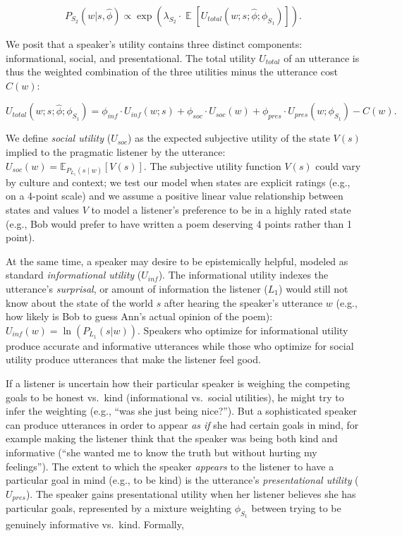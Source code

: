 \documentclass[oneside]{report}
\begin{document}
\[P_{S_2}(w | s, \hat{\phi}) \propto \exp(\lambda_{S_2} \cdot \mathop{\mathbb{E}}[U_{total}(w; s; \hat{\phi}; \phi_{S_1})]).\]

We posit that a speaker's utility contains three distinct components:
informational, social, and presentational. The total utility
\(U_{total}\) of an utterance is thus the weighted combination of the
three utilities minus the utterance cost \(C(w)\):

\[U_{total}(w; s; \hat{\phi}; \phi_{S_1}) = \phi_{inf} \cdot U_{inf}(w; s) + \phi_{soc} \cdot U_{soc}(w) + \phi_{pres} \cdot U_{pres}(w; \phi_{S_1}) - C(w).\]

We define \emph{social utility} (\(U_{soc}\)) as the expected subjective
utility of the state \(V(s)\) implied to the pragmatic listener by the
utterance: \(U_{soc}(w) = \mathbb{E}_{P_{L_1}(s \mid w)}[V(s)]\). The
subjective utility function \(V(s)\) could vary by culture and context;
we test our model when states are explicit ratings (e.g., on a 4-point
scale) and we assume a positive linear value relationship between states
and values \(V\) to model a listener's preference to be in a highly
rated state (e.g., Bob would prefer to have written a poem deserving 4
points rather than 1 point).

At the same time, a speaker may desire to be epistemically helpful,
modeled as standard \emph{informational utility} (\(U_{inf}\)). The
informational utility indexes the utterance's \emph{surprisal}, or
amount of information the listener (\(L_1\)) would still not know about
the state of the world \(s\) after hearing the speaker's utterance \(w\)
(e.g., how likely is Bob to guess Ann's actual opinion of the poem):
\(U_{inf}(w) = \ln(P_{L_1}(s | w))\). Speakers who optimize for
informational utility produce accurate and informative utterances while
those who optimize for social utility produce utterances that make the
listener feel good.

If a listener is uncertain how their particular speaker is weighing the
competing goals to be honest vs.~kind (informational vs.~social
utilities), he might try to infer the weighting (e.g., ``was she just
being nice?''). But a sophisticated speaker can produce utterances in
order to appear \emph{as if} she had certain goals in mind, for example
making the listener think that the speaker was being both kind and
informative (``she wanted me to know the truth but without hurting my
feelings''). The extent to which the speaker \emph{appears} to the
listener to have a particular goal in mind (e.g., to be kind) is the
utterance's \emph{presentational utility} (\(U_{pres}\)). The speaker
gains presentational utility when her listener believes she has
particular goals, represented by a mixture weighting \(\phi_{S_1}\)
between trying to be genuinely informative vs.~kind. Formally,
\end{document}
